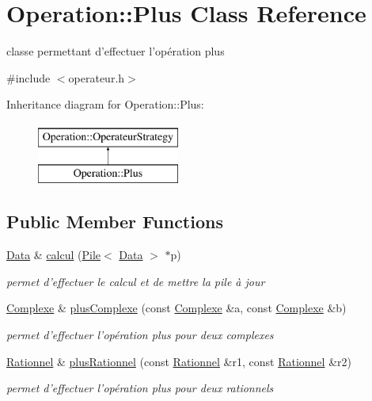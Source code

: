 \hypertarget{classOperation_1_1Plus}{
\section{Operation::Plus Class Reference}
\label{classOperation_1_1Plus}
}


classe permettant d'effectuer l'opération plus  




{\ttfamily \#include $<$operateur.h$>$}

Inheritance diagram for Operation::Plus:\begin{figure}[H]
\begin{center}
\leavevmode
\includegraphics[height=2cm]{classOperation_1_1Plus}
\end{center}
\end{figure}
\subsection*{Public Member Functions}
\begin{DoxyCompactItemize}
\item 
\hyperlink{classNombre_1_1Data}{Data} \& \hyperlink{classOperation_1_1Plus_ad497644da3ea64318f15777d1e3ddcc9}{calcul} (\hyperlink{classPile}{Pile}$<$ \hyperlink{classNombre_1_1Data}{Data} $>$ $\ast$p)
\begin{DoxyCompactList}\small\item\em permet d'effectuer le calcul et de mettre la pile à jour \item\end{DoxyCompactList}\item 
\hyperlink{classNombre_1_1Complexe}{Complexe} \& \hyperlink{classOperation_1_1Plus_aa80c86b918fd8e37d08ea892d3704596}{plusComplexe} (const \hyperlink{classNombre_1_1Complexe}{Complexe} \&a, const \hyperlink{classNombre_1_1Complexe}{Complexe} \&b)
\begin{DoxyCompactList}\small\item\em permet d'effectuer l'opération plus pour deux complexes \item\end{DoxyCompactList}\item 
\hyperlink{classNombre_1_1Rationnel}{Rationnel} \& \hyperlink{classOperation_1_1Plus_adb1aba33aad17c96c1d9b5624e8df22e}{plusRationnel} (const \hyperlink{classNombre_1_1Rationnel}{Rationnel} \&r1, const \hyperlink{classNombre_1_1Rationnel}{Rationnel} \&r2)
\begin{DoxyCompactList}\small\item\em permet d'effectuer l'opération plus pour deux rationnels \item\end{DoxyCompactList}\end{DoxyCompactItemize}


